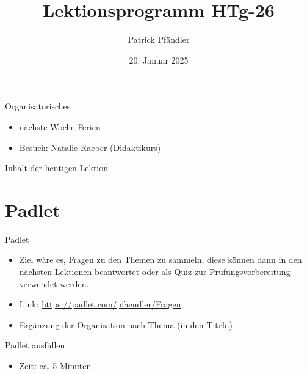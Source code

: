 



\title{\textbf{Lektionsprogramm HTg-26}}
\author{Patrick Pfändler}
\date{20. Januar 2025}




\frame{\titlepage}

\begin{frame}{Organisatorisches}
    \begin{itemize}
        \item[\textbullet] nächste Woche Ferien
        \item[\textbullet] Besuch: Natalie Raeber (Didaktikurs)
    \end{itemize}

\end{frame}

\folieFragen


\begin{frame}{Inhalt der heutigen Lektion}
    \tableofcontents
\end{frame}


\section{Padlet}
\BlueSectionSlide
\begin{frame}{Padlet}
    \begin{itemize}
        \item[\textbullet] Ziel wäre es, Fragen zu den Themen zu sammeln, diese können dann in den nächsten Lektionen beantwortet oder als Quiz zur Prüfungsvorbereitung verwendet werden.
        \item[\textbullet] Link: \url{https://padlet.com/pfaendler/Fragen}
        \item[\textbullet] Ergänzung der Organisation nach Thema (in den Titeln)
    \end{itemize}
\end{frame}


\begin{frame}{Padlet ausfüllen}

    \begin{itemize}
        \item Zeit: ca. 5 Minuten
    \end{itemize}

\end{frame}


